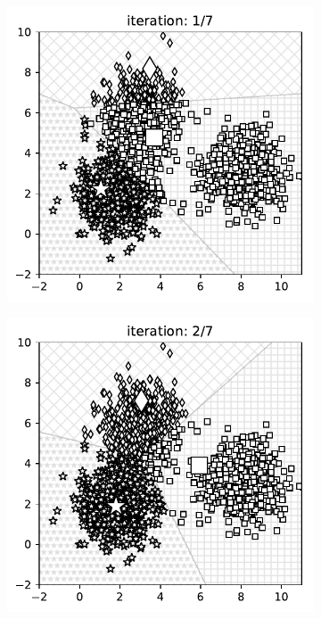 
\begin{figure}[t]
    \begin{subfigure}{0.325\textwidth}
    \includegraphics[width=0.99\linewidth]{ebookML_src/src/kmeans/ex_0.pdf}
    \end{subfigure}
    \begin{subfigure}{0.325\textwidth}
    \includegraphics[width=0.99\linewidth]{ebookML_src/src/kmeans/ex_1.pdf}

\end{subfigure}
\end{figure}
